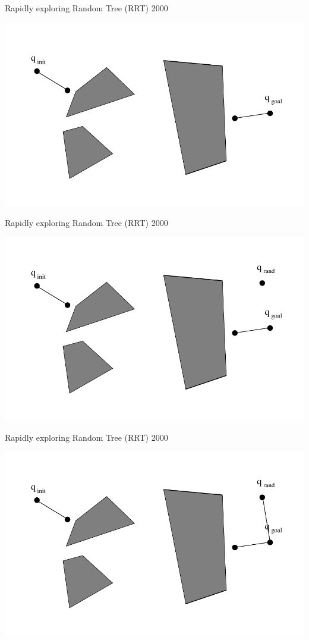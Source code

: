 \begin{frame} {Rapidly exploring Random Tree (RRT) 2000}
\centerline {
  \includegraphics[width=.8\linewidth]{figures/RRT06.pdf}
}
\end{frame}

\begin{frame} {Rapidly exploring Random Tree (RRT) 2000}
\centerline {
  \includegraphics[width=.8\linewidth]{figures/RRT07.pdf}
}
\end{frame}

\begin{frame} {Rapidly exploring Random Tree (RRT) 2000}
\centerline {
  \includegraphics[width=.8\linewidth]{figures/RRT08.pdf}
}
\end{frame}

